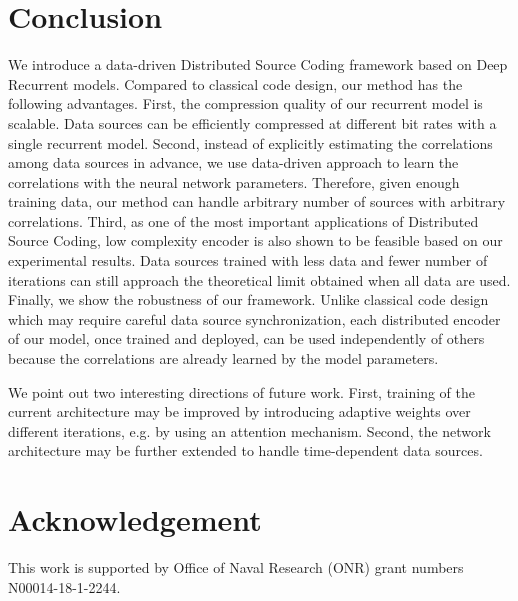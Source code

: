 \documentclass[10pt,twocolumn,letterpaper]{article}
\begin{document}
\section{Conclusion}
We introduce a data-driven Distributed Source Coding framework based on Deep Recurrent models. Compared to classical code design, our method has the following advantages. First, the compression quality of our recurrent model is scalable. Data sources can be efficiently compressed at different bit rates with a single recurrent model. Second, instead of explicitly estimating the correlations among data sources in advance, we use data-driven approach to learn the correlations with the neural network parameters. Therefore, given enough training data, our method can handle arbitrary number of sources with arbitrary correlations. Third, as one of the most important applications of Distributed Source Coding, low complexity encoder is also shown to be feasible based on our experimental results. Data sources trained with less data and fewer number of iterations can still approach the theoretical limit obtained when all data are used. Finally, we show the robustness of our framework. Unlike classical code design which may require careful data source synchronization, each distributed encoder of our model, once trained and deployed, can be used independently of others because the correlations are already learned by the model parameters. 

We point out two interesting directions of future work. First, training of the current architecture may be improved by introducing adaptive weights over different iterations, e.g. by using an attention mechanism. Second, the network architecture may be further extended to handle time-dependent data sources.
\section*{Acknowledgement}
This work is supported by Office of Naval Research (ONR) grant numbers N00014-18-1-2244.
{%
\balance


}
\end{document}
